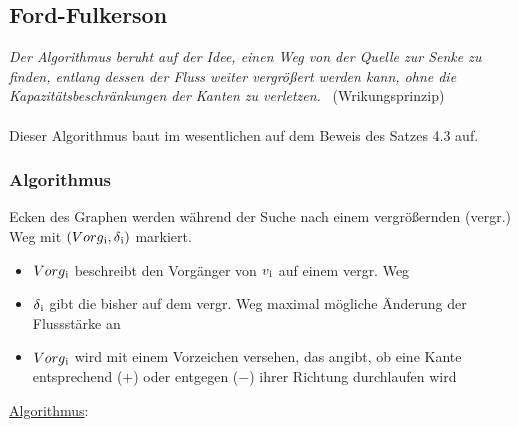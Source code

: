 \documentclass[11pt]{article}
\begin{document}
    \subsection{Ford-Fulkerson}
    \textit{Der Algorithmus beruht auf der Idee, einen Weg von der Quelle zur Senke zu finden, entlang dessen der Fluss weiter vergr\"o\ss{}ert werden kann, ohne die Kapazit\"atsbeschr\"ankungen der Kanten zu verletzen.}~\cite{ffwikipedia} (Wrikungsprinzip)\\~\\
    Dieser Algorithmus baut im wesentlichen auf dem Beweis des Satzes 4.3 auf.

    \subsubsection{Algorithmus}
    Ecken des Graphen werden w\"ahrend der Suche nach einem vergr\"o\ss{}ernden (vergr.) Weg mit $(Vorg\textsubscript{i},\delta\textsubscript{i})$ markiert.
    \begin{itemize}
        \item $Vorg\textsubscript{i}$ beschreibt den Vorg\"anger von $v\textsubscript{i}$ auf einem vergr. Weg
        \item $\delta\textsubscript{i}$ gibt die bisher auf dem vergr. Weg maximal m\"ogliche \"Anderung der Flussst\"arke an
        \item $Vorg\textsubscript{i}$ wird mit einem Vorzeichen versehen, das angibt, ob eine Kante entsprechend ($+$) oder entgegen ($-$) ihrer Richtung durchlaufen wird
    \end{itemize}
    \newpage
    \underline{Algorithmus}:
\end{document}
